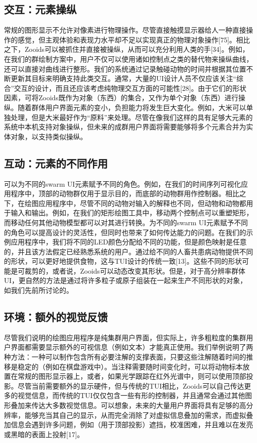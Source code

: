 \subsection{交互：元素操纵}

常规的图形显示不允许对像素进行物理操作。尽管直接触摸显示器给人一种直接操作的感觉，但主观体验和表现力水平却不足以实现真正的物理对象操作[75]。相比之下，Zooids可以被抓住并直接被操纵，从而可以充分利用人类的手[34]。例如，在我们的群绘制方案中，用户不仅可以使用诸如控制点之类的替代物来操纵曲线，还可以直接对曲线进行整形。我们的系统通过记录触碰动物的时间并根据其位置不断更新其目标来明确支持此类交互。通常，大量的UI设计人员不仅应该关注“综合”交互的设计，而且还应该考虑纯物理交互方面的可能性[28]。由于它们的形状因素，可将Zooids既作为对象（东西）的集合，又作为单个对象（东西）进行操纵。随着群体用户界面元素的变小，负担能力将发生巨大变化。例如，大米可以单独处理，但是大米最好作为“原料”来处理。尽管在像我们这样的具有足够大元素的系统中本机支持对象操纵，但未来的成群用户界面将需要能够将多个元素合并为实体对象，以支持类似操纵。

\subsection{互动：元素的不同作用}

可以为不同的swarm UI元素赋予不同的角色。例如，在我们的时间序列可视化应用程序中，顶部的动物群仅用于显示目的，而底部的动物群用作控制器。相比之下，在绘图应用程序中，尽管不同的动物对输入的解释也不同，但动物和动物都用于输入和输出。例如，在我们的矩形绘图工具中，移动两个控制点可以重塑矩形，而移动任何其他动物模型都可以对其进行转换。为不同的swarm UI元素赋予不同的角色可以提高设计的灵活性，但同时也带来了如何传达能力的问题。在我们的示例应用程序中，我们将不同的LED颜色分配给不同的功能，但是颜色映射是任意的，并且该方法假定已经熟悉系统的用户。通过给不同的人畜共患病动物提供不同的形状，可以更好地提供食物，这与TUI设计的传统一致[13]。这些不同的形状可能是可裁剪的，或者说，Zooids可以动态改变其形状。但是，对于高分辨率群体UI，更自然的方法是通过将许多粒子或原子组装在一起来生产不同形状的对象，如我们先前所讨论的。

\subsection{环境：额外的视觉反馈}

尽管我们说明的绘图应用程序是纯集群用户界面，但实际上，许多粗粒度的集群用户界面都需要显示额外的可视信息（例如文本）才能真正使用。我们举例说明了两种方法：一种可以制作包含所有必要注解的支撑表面，只要这些注解随着时间的推移是稳定的（例如在棋盘游戏中）。当注释需要随时间变化时，可以将动物标本放置在常规的图形显示器上，或者，如果光学跟踪在红外光谱中，则可以使用顶部投影。尽管当前需要额外的显示硬件，但与传统的TUI相比，Zooids可以自己传达更多的视觉信息，而传统的TUI仅仅包含一些有形的控制器，并且通常会通过其他图形叠加来传达大多数视觉信息。可以想象，未来的大量用户界面将具有足够的高分辨率，能够充当其自己的显示，从而完全消除了对虚拟信息叠加的需求，而虚拟叠加信息会遇到许多问题，例如（用于顶部投影）遮挡，校准困难，并且难以在发亮或黑暗的表面上投射[17]。


